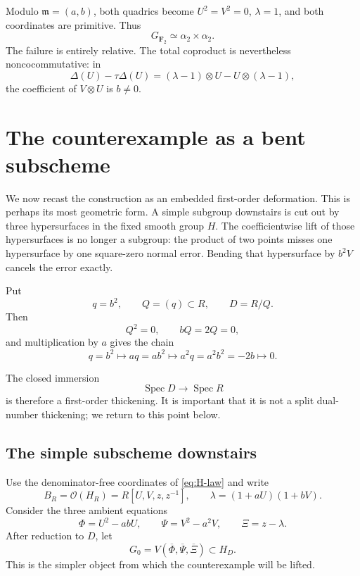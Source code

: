 \documentclass[11pt]{amsart}
\theoremstyle{definition}
\theoremstyle{remark}
\newcommand{\F}{\mathbf F}
\newcommand{\Spec}{\operatorname{Spec}}
\newcommand{\m}{\mathfrak m}
\newcommand{\ot}{\otimes}
\begin{document}
Modulo \(\m=(a,b)\), both quadrics become \(U^2=V^2=0\), \(\lambda=1\),
and both coordinates are primitive.  Thus
\[
 G_{\F_2}\simeq\alpha _2\times\alpha _2.
\]
The failure is entirely relative.  The total coproduct is nevertheless
noncocommutative: in
\[
 \Delta(U)-\tau\Delta(U)
 =(\lambda-1)\ot U-U\ot(\lambda-1),
\]
the coefficient of \(V\ot U\) is \(b\ne0\).

\section{The counterexample as a bent subscheme}
\label{sec:square-zero}

We now recast the construction as an embedded first-order deformation.
This is perhaps its most geometric form.  A simple subgroup downstairs
is cut out by three hypersurfaces in the fixed smooth group \(H\).  The
coefficientwise lift of those hypersurfaces is no longer a subgroup: the
product of two points misses one hypersurface by one square-zero normal
error.  Bending that hypersurface by \(b^2V\) cancels the error exactly.

Put
\[
 q=b^2,\qquad Q=(q)\subset R,\qquad D=R/Q.
\]
Then
\[
 Q^2=0,\qquad bQ=2Q=0,
\]
and multiplication by \(a\) gives the chain
\begin{equation}\label{eq:memory-chain}
 q=b^2\longmapsto aq=ab^2
 \longmapsto a^2q=a^2b^2=-2b
 \longmapsto0.
\end{equation}

The closed immersion
\[
 \Spec D\longrightarrow\Spec R
\]
is therefore a first-order thickening.  It is important that it is not a
split dual-number thickening; we return to this point below.

\subsection{The simple subscheme downstairs}

Use the denominator-free coordinates of \eqref{eq:H-law} and write
\[
 B_R=\mathcal O(H_R)=R[U,V,z,z^{-1}],\qquad
 \lambda=(1+aU)(1+bV).
\]
Consider the three ambient equations
\begin{equation}\label{eq:three-normal-equations}
 \Phi=U^2-abU,\qquad
 \Psi=V^2-a^2V,\qquad
 \Xi=z-\lambda.
\end{equation}
After reduction to \(D\), let
\[
 G_0=V(\overline\Phi,\overline\Psi,\overline\Xi)
 \subset H_D.
\]
This is the simpler object from which the counterexample will be lifted.
\end{document}
